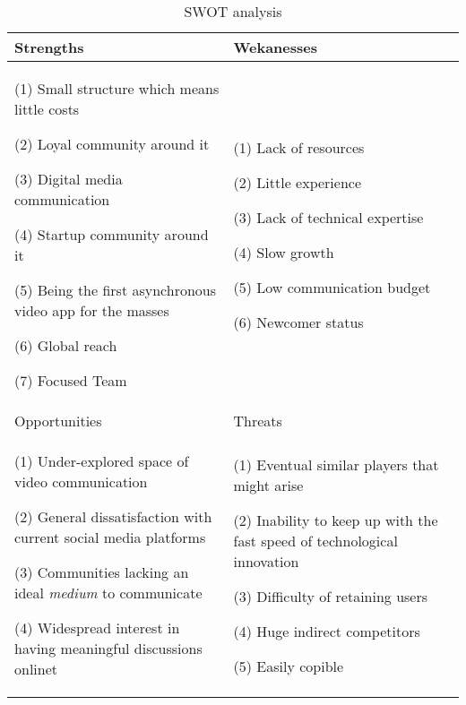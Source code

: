 \documentclass[12pt]{article}
\begin{document}
\begin{table}[htbp]
\small
\caption{SWOT analysis}
\label{table:swot}
\centering
\begin{tabular}{ @{}P{0.48\textwidth}P{0.48\textwidth}@{} }
\hline
Strengths                             &  Wekanesses                                                                                                                                                                                                                                                                                                                                                            
\\ \hline  
(1) Small structure which means little costs \par (2) Loyal community around it \par (3) Digital media communication \par (4) Startup community around it \par 	(5) Being the first asynchronous video app for the masses \par (6) Global reach \par (7) Focused Team & (1) Lack of resources \par (2) Little experience \par (3) Lack of technical expertise \par (4) Slow growth  \par (5) Low communication budget \par (6) Newcomer status  \\                                                                                                                                                                                                                    \hline
Opportunities		&	Threats
\\ \hline
 (1) Under-explored space of video communication \par (2) General dissatisfaction with current social media platforms \par (3) Communities lacking an ideal \textit{medium} to communicate	\par (4) Widespread interest in having meaningful discussions onlinet	&  (1) Eventual similar players that might arise \par (2) Inability to keep up with the fast speed of technological innovation \par (3) Difficulty of retaining users  \par (4) Huge indirect competitors \par (5) Easily copible
 \\ \hline
\end{tabular}
\end{table}
\end{document}

